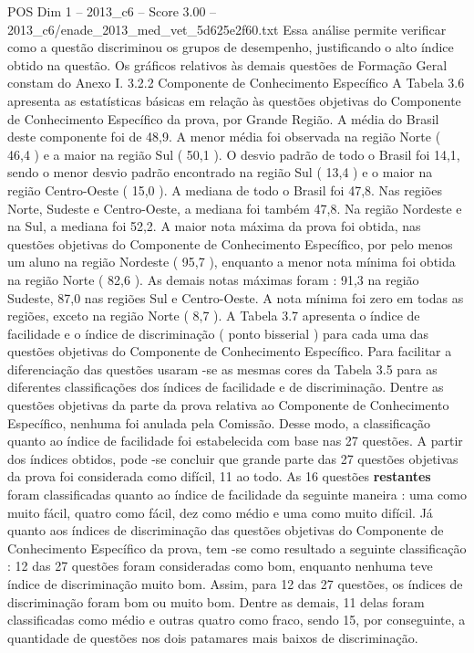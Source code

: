 \begin{textsample}{POS Dim 1 – 2013\_c6 – Score 3.00 – 2013\_c6/enade\_2013\_med\_vet\_5d625e2f60.txt}
Essa análise permite verificar como a questão discriminou os grupos de desempenho, justificando o alto índice obtido na questão.
Os gráficos relativos às demais questões de Formação Geral constam do Anexo I. 3.2.2 Componente de Conhecimento Específico A Tabela 3.6 apresenta as estatísticas básicas em relação às questões objetivas do Componente de Conhecimento Específico da prova, por Grande Região.
A média do Brasil deste componente foi de 48,9.
A menor média foi observada na região Norte ( 46,4 ) e a maior na região Sul ( 50,1 ).
O desvio padrão de todo o Brasil foi 14,1, sendo o menor desvio padrão encontrado na região Sul ( 13,4 ) e o maior na região Centro-Oeste ( 15,0 ).
A mediana de todo o Brasil foi 47,8.
Nas regiões Norte, Sudeste e Centro-Oeste, a mediana foi também 47,8.
Na região Nordeste e na Sul, a mediana foi 52,2.
A maior nota máxima da prova foi obtida, nas questões objetivas do Componente de Conhecimento Específico, por pelo menos um aluno na região Nordeste ( 95,7 ), enquanto a menor nota mínima foi obtida na região Norte ( 82,6 ).
As demais notas máximas foram : 91,3 na região Sudeste, 87,0 nas regiões Sul e Centro-Oeste.
A nota mínima foi zero em todas as regiões, exceto na região Norte ( 8,7 ).
A Tabela 3.7 apresenta o índice de facilidade e o índice de discriminação ( ponto bisserial ) para cada uma das questões objetivas do Componente de Conhecimento Específico.
Para facilitar a diferenciação das questões usaram -se as mesmas cores da Tabela 3.5 para as diferentes classificações dos índices de facilidade e de discriminação.
Dentre as questões objetivas da parte da prova relativa ao Componente de Conhecimento Específico, nenhuma foi anulada pela Comissão.
Desse modo, a classificação quanto ao índice de facilidade foi estabelecida com base nas 27 questões.
A partir dos índices obtidos, pode -se concluir que grande parte das 27 questões objetivas da prova foi considerada como difícil, 11 ao todo.
As 16 questões \textbf{restantes} foram classificadas quanto ao índice de facilidade da seguinte maneira : uma como muito fácil, quatro como fácil, dez como médio e uma como muito difícil.
Já quanto aos índices de discriminação das questões objetivas do Componente de Conhecimento Específico da prova, tem -se como resultado a seguinte classificação : 12 das 27 questões foram consideradas como bom, enquanto nenhuma teve índice de discriminação muito bom.
Assim, para 12 das 27 questões, os índices de discriminação foram bom ou muito bom.
Dentre as demais, 11 delas foram classificadas como médio e outras quatro como fraco, sendo 15, por conseguinte, a quantidade de questões nos dois patamares mais baixos de discriminação.

\end{textsample}
